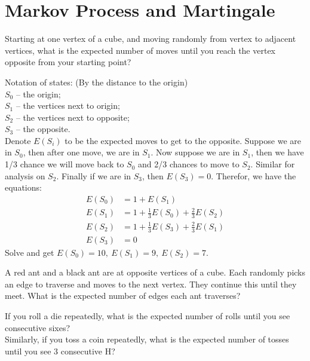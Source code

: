 \section{Markov Process and Martingale}
\begin{exe}
Starting at one vertex of a cube, and moving randomly from
vertex to adjacent vertices, what is the expected number of moves until you
reach the vertex opposite from your starting point?
\end{exe}
\begin{teacher}
\begin{sol}
Notation of states: (By the distance to the origin)\\
$S_0$ -- the origin;\\
$S_1$ -- the vertices next to origin;\\
$S_2$ -- the vertices next to opposite;\\
$S_3$ -- the opposite.\\
Denote $E(S_i)$ to be the expected moves to get to the opposite. Suppose we are in $S_0$, then after one move, we are in $S_1$. Now suppose we are in $S_1$, then we have 1/3 chance we will move back to $S_0$ and 2/3 chances to move to $S_2$. Similar for analysis on $S_2$. Finally if we are in $S_3$, then $E(S_3)=0$. Therefor, we have the equations:
\begin{align*}
E(S_0) &= 1+E(S_1)\\    
E(S_1) &= 1+\frac{1}{3}E(S_0)+\frac{2}{3}E(S_2)\\
E(S_2) &= 1+\frac{1}{3}E(S_3)+\frac{2}{3}E(S_1)\\
E(S_3) &= 0
\end{align*}
Solve and get $E(S_0)=10,\ E(S_1) =9,\ E(S_2) = 7$.
\end{sol}
\end{teacher}

\begin{exe}
A red ant and a black ant are at opposite vertices of a cube. Each randomly picks an edge to traverse and moves to the next vertex. They continue this until they meet. What is the expected number of edges each ant traverses?
\end{exe}
\begin{teacher}
\begin{sol}
\end{sol}
\end{teacher}

\begin{exe}
If you roll a die repeatedly, what is the expected number of rolls until you see consecutive sixes?\\
Similarly, if you toss a coin repeatedly, what is the expected number of tosses until you see 3 consecutive H?
\end{exe}
\begin{teacher}
\begin{sol}
\end{sol}
\end{teacher}

